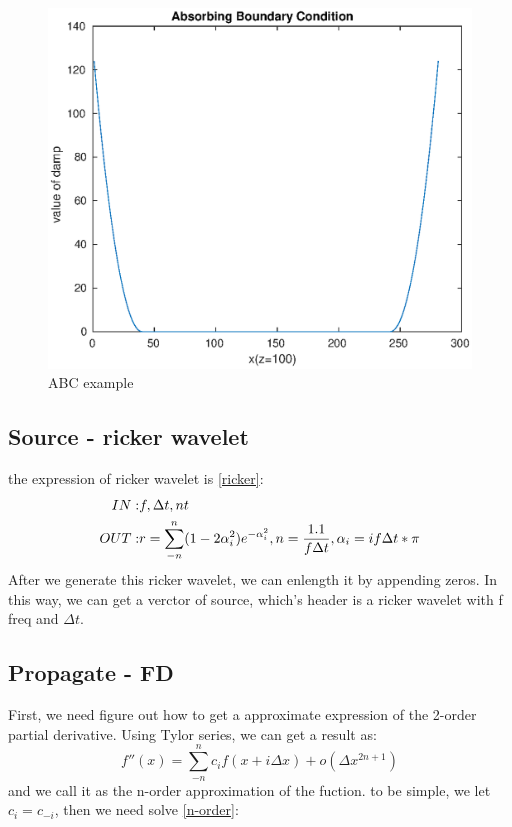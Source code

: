 \documentclass[a4paper, UTF8]{article}
\begin{document}
		\begin{figure}
			\centering
			\includegraphics[width=0.5\linewidth]{fig/ABC.eps}
			\caption{ABC example}
			\label{ABCfigure}
		\end{figure}

	\subsection{Source - ricker wavelet}
		the expression of ricker wavelet is \autoref{ricker}:
		\begin{equation}
			\begin{aligned}
				IN: & f, \Delta t, nt\\
				OUT:& r = \sum_{-n}^{n}(1-2\alpha_i^2 )e^{- \alpha_i^2 }, n = \frac{1.1}{f\Delta t}, \alpha_i = if\Delta t * \pi
			\end{aligned}
			\label{ricker}
			\centering
		\end{equation}
		After we generate this ricker wavelet, we can enlength it by appending zeros. In this way, we can get a verctor of source, which's header is a ricker wavelet with f freq and $\Delta t$.
	
	\subsection{Propagate - FD}

		First, we need figure out how to get a approximate expression of the 2-order partial derivative. Using Tylor series, we can get a result as:
			$$f''(x)=\sum_{-n}^{n}c_{i}f(x+i\Delta x) + o(\Delta x ^{2n+1})$$
		and we call it as the n-order approximation of the fuction. to be simple, we let $c_i=c_{-i}$, then we need solve \autoref{n-order}:
\end{document}
